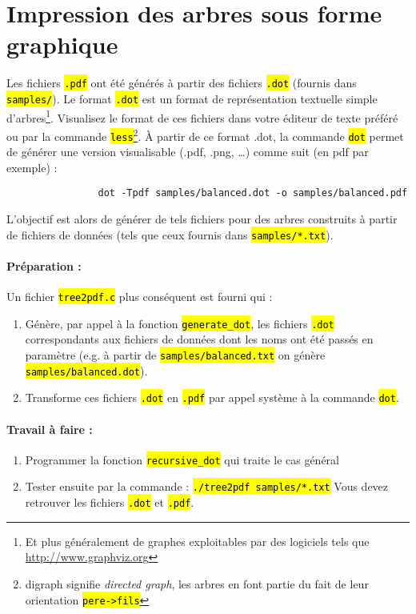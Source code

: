 \documentclass[final, pdftex, a4paper, openbib, ]{article}
\let\OldTexttt\texttt
\renewcommand{\texttt}[1]{\OldTexttt{\hl{#1}}}
\begin{document}
\section{Impression des arbres sous forme graphique}
Les fichiers \texttt{.pdf} ont été générés à partir des fichiers \texttt{.dot} (fournis dans \texttt{samples/}).
Le format \texttt{.dot} est un format de représentation textuelle simple d'arbres\footnote{Et plus généralement de graphes exploitables par des logiciels tels que \url{http://www.graphviz.org}}.
Visualisez le format de ces fichiers dans votre éditeur de texte préféré ou par la commande \texttt{less}\footnote{digraph signifie \textit{directed graph}, les arbres en font partie du fait de leur orientation \texttt{pere->fils}}.
À partir de ce format .dot, la commande \texttt{dot} permet de générer une version visualisable (.pdf, .png, \ldots) comme suit (en pdf par exemple) :

\begin{verbatim}
				dot -Tpdf samples/balanced.dot -o samples/balanced.pdf
\end{verbatim}

L'objectif est alors de générer de tels fichiers pour des arbres construits à partir de fichiers de données (tels que ceux fournis dans \texttt{samples/*.txt}).
					
\paragraph{Préparation :} Un fichier \texttt{tree2pdf.c} plus conséquent est fourni qui :
\begin{enumerate}
	\item Génère, par appel à la fonction \texttt{generate\_dot}, les fichiers \texttt{.dot} correspondants aux fichiers de données dont les noms ont été passés en paramètre (e.g. à partir de \texttt{samples/balanced.txt} on génère \texttt{samples/balanced.dot}).
	\item Transforme ces fichiers \texttt{.dot} en \texttt{.pdf} par appel système à la commande \texttt{dot}.
\end{enumerate}

\paragraph{Travail à faire :}
\begin{enumerate}
	\item Programmer la fonction \texttt{recursive\_dot} qui traite le cas général
	\item Tester ensuite par la commande : \texttt{./tree2pdf samples/*.txt}
Vous devez retrouver les fichiers \texttt{.dot} et \texttt{.pdf}.
\end{enumerate}
\end{document}
